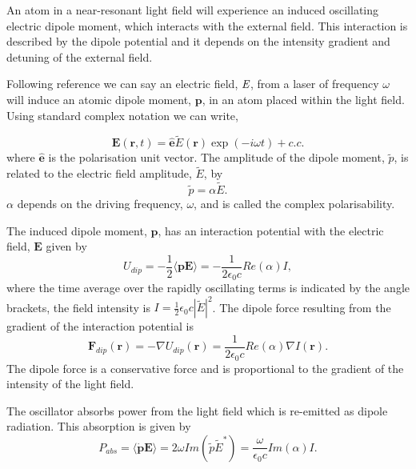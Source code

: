 An atom in a near-resonant light field will experience an induced oscillating electric dipole moment, which interacts with the external field. This interaction is described by the dipole potential and it depends on the intensity gradient and detuning of the external field.

Following reference \cite{grimm_optical_2000} we can say an electric field, $\emph{E}$, from a laser of frequency $\omega$ will induce an atomic dipole moment, $\boldsymbol{p}$, in an atom placed within the light field. Using standard complex notation we can write,

\begin{equation}\label{eq:efield}
\boldsymbol E (\boldsymbol r ,t)=\hat{\boldsymbol e} \tilde E (\boldsymbol r) \exp(-i\omega t) + c.c.
\end{equation}
where $\hat{\boldsymbol{e}}$ is the polarisation unit vector. The amplitude of the dipole moment, $\tilde p$, is related to the electric field amplitude, $\tilde E$, by
\begin{equation}\label{eq:polarisability}
\tilde p = \alpha \tilde E.
\end{equation}
$\alpha$ depends on the driving frequency, $\omega$, and is called the complex polarisability.

The induced dipole moment, $\boldsymbol p$, has an interaction potential with the electric field, $\boldsymbol E$ given by\cite{grimm_optical_2000}
\begin{equation}\label{eq:interaction_pot}
U_{dip} = - \frac{1}{2} \langle \boldsymbol{pE} \rangle = - \frac{1}{2 \epsilon_0 c} Re(\alpha)I,
\end{equation}
where the time average over the rapidly oscillating terms is indicated by the angle brackets, the field intensity is $I=\frac{1}{2}\epsilon_0 c |\tilde E|^2$. The dipole force resulting from the gradient of the interaction potential is\cite{metcalf_laser_1999}
\begin{equation}\label{eq:dipole_force}
\boldsymbol F_{dip}(\boldsymbol r ) = - \nabla U_{dip}(\boldsymbol r) = \frac{1}{2 \epsilon_0 c} Re(\alpha) \nabla I(\boldsymbol r).
\end{equation}
The dipole force is a conservative force and is proportional to the gradient of the intensity of the light field.

The oscillator absorbs power from the light field which is re-emitted as dipole radiation. This absorption is given by
\begin{equation}\label{eq:power_absorbed}
P_{abs} = \langle \boldsymbol{\dot p E} \rangle = 2 \omega Im(\tilde p \tilde E^*) = \frac{\omega}{\epsilon_0 c} Im (\alpha) I.
\end{equation}

